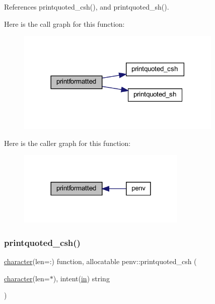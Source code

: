 References printquoted\+\_\+csh(), and printquoted\+\_\+sh().

Here is the call graph for this function\+:
\nopagebreak
\begin{figure}[H]
\begin{center}
\leavevmode
\includegraphics[width=278pt]{penv_8f90_a53f464ba778289ef53d33f9c0e2130c0_cgraph}
\end{center}
\end{figure}
Here is the caller graph for this function\+:
\nopagebreak
\begin{figure}[H]
\begin{center}
\leavevmode
\includegraphics[width=228pt]{penv_8f90_a53f464ba778289ef53d33f9c0e2130c0_icgraph}
\end{center}
\end{figure}
\mbox{\label{penv_8f90_a8352a8cad3a618a85c981f11beb23715}} 
\subsubsection{\texorpdfstring{printquoted\+\_\+csh()}{printquoted\_csh()}}
{\footnotesize\ttfamily \hyperlink{option__stopwatch_83_8txt_abd4b21fbbd175834027b5224bfe97e66}{character}(len=\+:) function, allocatable penv\+::printquoted\+\_\+csh (\begin{DoxyParamCaption}\item[{\hyperlink{option__stopwatch_83_8txt_abd4b21fbbd175834027b5224bfe97e66}{character}(len=$\ast$), intent(\hyperlink{M__journal_83_8txt_afce72651d1eed785a2132bee863b2f38}{in})}]{string }\end{DoxyParamCaption})}

